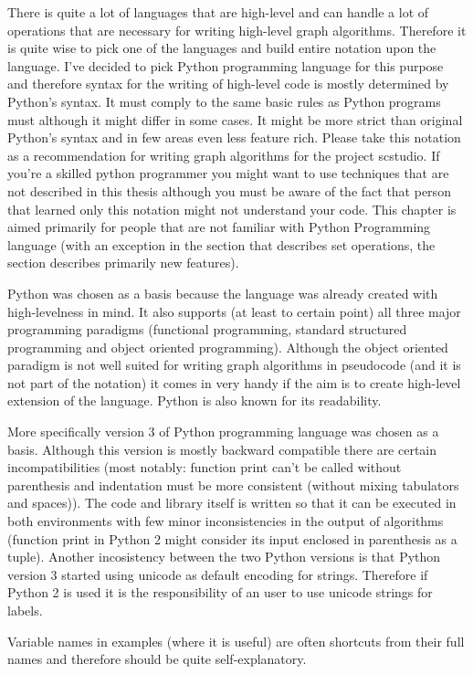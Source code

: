 \documentclass[11pt,oneside]{fithesis2}
\begin{document}
There is quite a lot of languages that are high-level and can handle a lot of operations that are necessary for writing high-level graph algorithms. Therefore it is quite wise to pick one of the languages and build entire notation upon the language. I've decided to pick Python programming language for this purpose and therefore syntax for the writing of high-level code is mostly determined by Python's syntax. It must comply to the same basic rules as Python programs must although it might differ in some cases. It might be more strict than original Python's syntax and in few areas even less feature rich. Please take this notation as a recommendation for writing graph algorithms for the project scstudio. If you're a skilled python programmer you might want to use techniques that are not described in this thesis although you must be aware of the fact that person that learned only this notation might not understand your code. This chapter is aimed primarily for people that are not familiar with Python Programming language (with an exception in the section that describes set operations, the section describes primarily new features).


Python was chosen as a basis because the language was already created with high-levelness in mind. It also supports (at least to certain point) all three major programming paradigms (functional programming, standard structured programming and object oriented programming). Although the object oriented paradigm is not well suited for writing graph algorithms in pseudocode (and it is not part of the notation) it comes in very handy if the aim is to create high-level extension of the language. Python is also known for its readability.

More specifically version 3 of Python programming language was chosen as a basis. Although this version is mostly backward compatible there are certain incompatibilities (most notably: function print can't be called without parenthesis and indentation must be more consistent (without mixing tabulators and spaces)). The code and library itself is written so that it can be executed in both environments with few minor inconsistencies in the output of algorithms (function print in Python 2 might consider its input enclosed in parenthesis as a tuple). Another incosistency between the two Python versions is that Python version 3 started using unicode as default encoding for strings. Therefore if Python 2 is used it is the responsibility of an user to use unicode strings for labels.

Variable names in examples (where it is useful) are often shortcuts from their full names and therefore should be quite self-explanatory.
\end{document}
